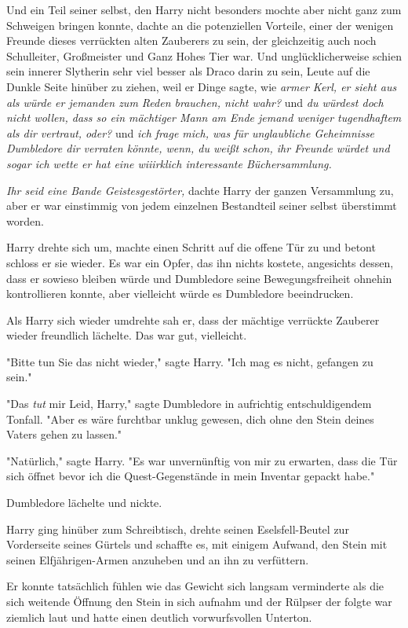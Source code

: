 {Und ein Teil seiner selbst, den Harry nicht besonders mochte aber nicht ganz zum Schweigen bringen konnte, dachte an die potenziellen Vorteile, einer der wenigen Freunde dieses verrückten alten Zauberers zu sein, der gleichzeitig auch noch Schulleiter, Großmeister und Ganz Hohes Tier war. Und unglücklicherweise schien sein innerer Slytherin sehr viel besser als Draco darin zu sein, Leute auf die Dunkle Seite hinüber zu ziehen, weil er Dinge sagte, wie \emph{armer Kerl, er sieht aus als würde er jemanden zum Reden brauchen, nicht wahr?} und \emph{du würdest doch nicht wollen, dass so ein mächtiger Mann am Ende jemand weniger tugendhaftem als dir vertraut, oder?} und \emph{ich frage mich, was für unglaubliche Geheimnisse Dumbledore dir verraten könnte, wenn, du weißt schon, ihr Freunde würdet und sogar ich wette er hat eine wiiirklich interessante Büchersammlung.}

\emph{Ihr seid eine Bande Geistesgestörter,} dachte Harry der ganzen Versammlung zu, aber er war einstimmig von jedem einzelnen Bestandteil seiner selbst überstimmt worden.

Harry drehte sich um, machte einen Schritt auf die offene Tür zu und betont schloss er sie wieder. Es war ein Opfer, das ihn nichts kostete, angesichts dessen, dass er sowieso bleiben würde und Dumbledore seine Bewegungsfreiheit ohnehin kontrollieren konnte, aber vielleicht würde es Dumbledore beeindrucken.

Als Harry sich wieder umdrehte sah er, dass der mächtige verrückte Zauberer wieder freundlich lächelte. Das war gut, vielleicht.

"Bitte tun Sie das nicht wieder," sagte Harry. "Ich mag es nicht, gefangen zu sein."

"Das \emph{tut} mir Leid, Harry," sagte Dumbledore in aufrichtig entschuldigendem Tonfall. "Aber es wäre furchtbar unklug gewesen, dich ohne den Stein deines Vaters gehen zu lassen."

"Natürlich," sagte Harry. "Es war unvernünftig von mir zu erwarten, dass die Tür sich öffnet bevor ich die Quest-Gegenstände in mein Inventar gepackt habe."

Dumbledore lächelte und nickte.

Harry ging hinüber zum Schreibtisch, drehte seinen Eselsfell-Beutel zur Vorderseite seines Gürtels und schaffte es, mit einigem Aufwand, den Stein mit seinen Elfjährigen-Armen anzuheben und an ihn zu verfüttern.

Er konnte tatsächlich fühlen wie das Gewicht sich langsam verminderte als die sich weitende Öffnung den Stein in sich aufnahm und der Rülpser der folgte war ziemlich laut und hatte einen deutlich vorwurfsvollen Unterton.

}
